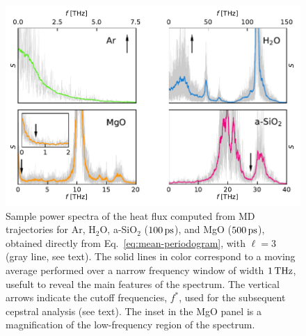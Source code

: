 \begin{figure}[!htb]
    \centering
    \includegraphics[width=\textwidth]{chapters/chapter5/figures/periodograms.pdf}
    \caption{Sample power spectra of the heat flux computed from MD trajectories for Ar, H$_2$O, a-SiO$_2$ ($100\,\mathrm{ps}$), and MgO ($500\,\mathrm{ps}$), obtained directly from Eq.~\eqref{eq:mean-periodogram}, with $\ell=3$ (gray line, see text). The solid lines in color correspond to a moving average performed over a narrow frequency window of width $1\,\mathrm{THz}$, usefult to reveal the main features of the spectrum. The vertical arrows indicate the cutoff frequencies, $f^*$, used for the subsequent cepstral analysis (see text). The inset in the MgO panel is a magnification of the low-frequency region of the spectrum.}
    \label{fig:periodograms}
\end{figure}

